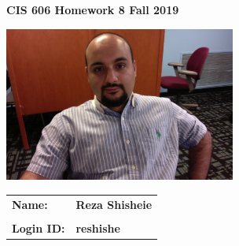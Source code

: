\documentclass[11pt]{article}
\begin{document}
\thispagestyle{plain}

\begin{center}
{\Large \bf CIS 606 \hfil Homework 8 \hfil Fall 2019} \\%
\end{center}

\vskip 1in 

\centerline{\includegraphics[width=3in]{photo.jpg}}

\vskip 0.5in 


\begin{center}
\begin{tabular}{ll}
{\bf Name:}     & {\bf Reza Shisheie } \\ \\
{\bf Login ID:} & {\bf reshishe }   
\end{tabular}
\end{center}

\newpage
\end{document}
